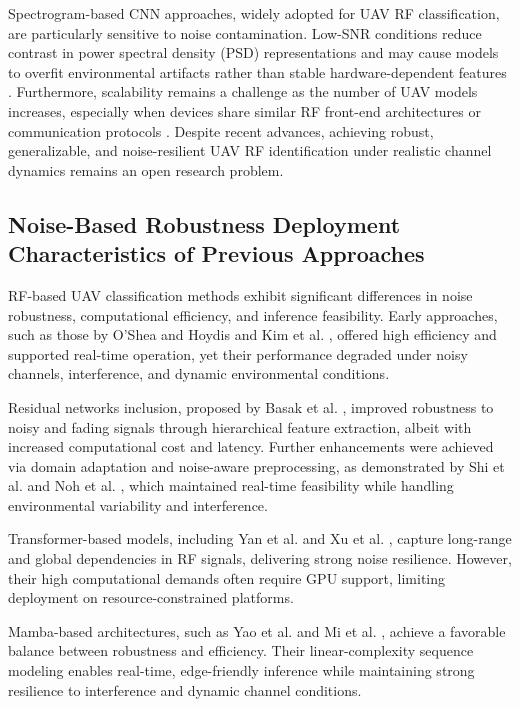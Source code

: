 \documentclass[runningheads]{llncs}
\begin{document}
Spectrogram-based CNN approaches, widely adopted for UAV RF classification, are particularly sensitive to noise contamination. Low-SNR conditions reduce contrast in power spectral density (PSD) representations and may cause models to overfit environmental artifacts rather than stable hardware-dependent features \cite{Noh2022}. Furthermore, scalability remains a challenge as the number of UAV models increases, especially when devices share similar RF front-end architectures or communication protocols \cite{Jang2021,Huang2024}. Despite recent advances, achieving robust, generalizable, and noise-resilient UAV RF identification under realistic channel dynamics remains an open research problem.

\subsection{Noise-Based Robustness Deployment Characteristics of Previous Approaches}
RF-based UAV classification methods exhibit significant differences in noise robustness, computational efficiency, and inference feasibility. Early approaches, such as those by O’Shea and Hoydis \cite{oshea2017introduction} and Kim et al. \cite{kim2018drone}, offered high efficiency and supported real-time operation, yet their performance degraded under noisy channels, interference, and dynamic environmental conditions.

Residual networks inclusion, proposed by Basak et al. \cite{ref11}, improved robustness to noisy and fading signals through hierarchical feature extraction, albeit with increased computational cost and latency. Further enhancements were achieved via domain adaptation and noise-aware preprocessing, as demonstrated by Shi et al. \cite{shi2022domain} and Noh et al. \cite{Noh2022}, which maintained real-time feasibility while handling environmental variability and interference.

Transformer-based models, including Yan et al. \cite{yan2023signalformer} and Xu et al. \cite{xu2025rfv}, capture long-range and global dependencies in RF signals, delivering strong noise resilience. However, their high computational demands often require GPU support, limiting deployment on resource-constrained platforms.

Mamba-based architectures, such as Yao et al. \cite{yao2025mambarf} and Mi et al. \cite{mi2026marnet}, achieve a favorable balance between robustness and efficiency. Their linear-complexity sequence modeling enables real-time, edge-friendly inference while maintaining strong resilience to interference and dynamic channel conditions.
\end{document}
